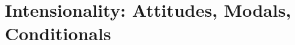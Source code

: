 \documentclass{kvf-lecturenotes}
\begin{document}
\dominitoc



\mainmatter

\pagestyle{kaiheadings}

\part{Intensionality: Attitudes, Modals, Conditionals}

 

% 
% 

%
%
%
%

\printbibliography
 
\end{document}
